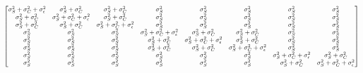 \documentclass[12pt, utf8]{article}
\begin{document}
\[
\scalemath{0.75}{
\begin{bmatrix}
\sigma^2_{S} + \sigma^2_{C} + \sigma^2_{\epsilon} & \sigma^2_{S} + \sigma^2_{C} & \sigma^2_{S} + \sigma^2_{C} & \sigma^2_{S} & \sigma^2_{S} & \sigma^2_{S} & \sigma^2_{S} & \sigma^2_{S} \\ 
\sigma^2_{S} + \sigma^2_{C} & \sigma^2_{S} + \sigma^2_{C} + \sigma^2_{\epsilon} & \sigma^2_{S} + \sigma^2_{C} & \sigma^2_{S} & \sigma^2_{S} & \sigma^2_{S} & \sigma^2_{S} & \sigma^2_{S} \\
\sigma^2_{S} + \sigma^2_{C} & \sigma^2_{S} + \sigma^2_{C} & \sigma^2_{S} + \sigma^2_{C} + \sigma^2_{\epsilon}& \sigma^2_{S} & \sigma^2_{S} & \sigma^2_{S} & \sigma^2_{S} & \sigma^2_{S} \\
\sigma^2_{S} & \sigma^2_{S} & \sigma^2_{S} & \sigma^2_{S} + \sigma^2_{C} + \sigma^2_{\epsilon} & \sigma^2_{S} + \sigma^2_{C} & \sigma^2_{S} + \sigma^2_{C} & \sigma^2_{S} & \sigma^2_{S} \\
\sigma^2_{S} & \sigma^2_{S} & \sigma^2_{S} & \sigma^2_{S} + \sigma^2_{C} & \sigma^2_{S} + \sigma^2_{C} + \sigma^2_{\epsilon} & \sigma^2_{S} + \sigma^2_{C} & \sigma^2_{S} & \sigma^2_{S} \\
\sigma^2_{S} & \sigma^2_{S} & \sigma^2_{S} & \sigma^2_{S} + \sigma^2_{C} & \sigma^2_{S} + \sigma^2_{C} & \sigma^2_{S} + \sigma^2_{C} + \sigma^2_{\epsilon}& \sigma^2_{S} & \sigma^2_{S} \\
\sigma^2_{S} & \sigma^2_{S} & \sigma^2_{S} & \sigma^2_{S} & \sigma^2_{S} & \sigma^2_{S} & \sigma^2_{S} + \sigma^2_{C} + \sigma^2_{\epsilon} & \sigma^2_{S} + \sigma^2_{C} \\ 
\sigma^2_{S} & \sigma^2_{S} & \sigma^2_{S} & \sigma^2_{S} & \sigma^2_{S} & \sigma^2_{S} & \sigma^2_{S} + \sigma^2_{C} & \sigma^2_{S} + \sigma^2_{C} + \sigma^2_{\epsilon}
\end{bmatrix}
}
\]
\end{document}
